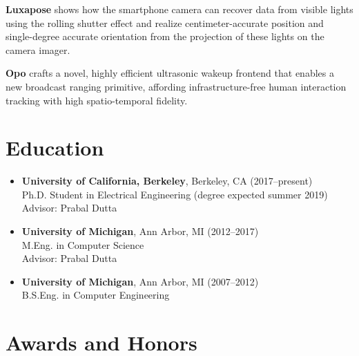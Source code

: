 \documentclass{article}
\begin{document}
\begin{itemize}
    \textbf{Luxapose} shows how the smartphone camera can recover data from
    visible lights using the rolling shutter effect and realize
    centimeter-accurate position and single-degree accurate orientation from
    the projection of these lights on the camera imager.

    \textbf{Opo} crafts a novel, highly efficient ultrasonic wakeup
    frontend that enables a new broadcast ranging primitive, affording
    infrastructure-free human interaction tracking with high spatio-temporal
    fidelity.

\end{itemize}




\section*{Education}

\begin{itemize}
  \item[]
    \textbf{University of California, Berkeley}, Berkeley, CA (2017--present) \\
    Ph.D. Student in Electrical Engineering (degree expected summer 2019) \\
    Advisor: Prabal Dutta

  \item[]
    \textbf{University of Michigan}, Ann Arbor, MI (2012--2017) \\
    M.Eng. in Computer Science \\
    Advisor: Prabal Dutta

  \item[]
    \textbf{University of Michigan}, Ann Arbor, MI (2007--2012) \\
    B.S.Eng. in Computer Engineering
\end{itemize}




\section*{Awards and Honors}
\end{document}
